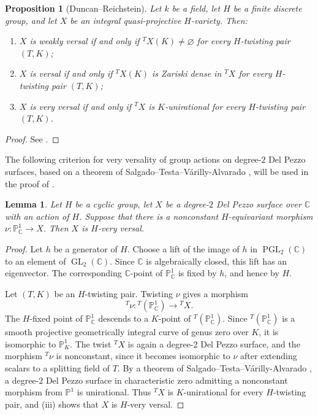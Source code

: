 \documentclass{amsart}
\newtheorem{prop}[prop]{Proposition}
\newtheorem{lemma}[lemma]{Lemma}
\theoremstyle{definition}
\theoremstyle{remark}
\numberwithin{equation}{section}
\newcommand{\C}{\mathbb C}
\renewcommand{\P}{\mathbb P}
\begin{document}
\begin{prop}[Duncan--Reichstein]\label{prop:twist-criterion}
Let $k$ be a field, let $H$ be a finite discrete group, and let $X$ be an integral quasi-projective $H$-variety. Then:
\begin{enumerate}[label=\textup{(\roman*)}]
 \item $X$ is weakly versal if and only if
 ${}^T\!X(K)\ne\varnothing$ for every $H$-twisting pair $(T,K)$;
 \item $X$ is versal if and only if ${}^T\!X(K)$ is Zariski dense in
 ${}^T\!X$ for every $H$-twisting pair $(T,K)$;
 \item $X$ is very versal if and only if ${}^T\!X$ is $K$-unirational
 for every $H$-twisting pair $(T,K)$.
\end{enumerate}
\end{prop}

\begin{proof}
See \cite[Theorem~1.1(a)--(c)]{Duncan-Reichstein}.
\end{proof}

The following criterion for very versality of group actions on degree-$2$
Del Pezzo surfaces, based on a theorem of Salgado--Testa--V\'arilly-Alvarado \cite[Theorem~17]{Salgado-Testa-VA}, will be used in the proof of .

\begin{lemma}\label{lem:fixed-rational-curve}
Let $H$ be a cyclic group, let $X$ be a degree-$2$ Del Pezzo surface over $\C$ with an action of $H$. Suppose that there is a nonconstant $H$-equivariant morphism $\nu:\mathbb P^1_\C\to X$. Then $X$ is $H$-very versal.
\end{lemma}

\begin{proof}
Let $h$ be a generator of $H$. Choose a lift of the image of $h$ in
$\operatorname{PGL}_2(\C)$ to an element of $\operatorname{GL}_2(\C)$. Since
$\C$ is algebraically closed, this lift has an eigenvector. The corresponding
$\C$-point of $\mathbb P^1_\C$ is fixed by $h$, and hence by $H$.

Let $(T,K)$ be an $H$-twisting pair. Twisting $\nu$ gives a morphism
\[
 {}^T\!\nu:{}^T\!(\mathbb P^1_\C)\longrightarrow{}^T\!X.
\]
The $H$-fixed point of $\mathbb P^1_\C$ descends to a $K$-point of
${}^T\!(\mathbb P^1_\C)$. Since ${}^T\!(\mathbb P^1_\C)$ is a smooth projective
geometrically integral curve of genus zero over $K$, it is isomorphic to $\P^1_K$. The twist ${}^T\!X$ is again a degree-$2$ Del Pezzo surface, and the morphism ${}^T\!\nu$ is nonconstant, since it becomes isomorphic to $\nu$ after extending scalars to a splitting field of $T$. By a theorem of Salgado--Testa--V\'arilly-Alvarado
\cite[Theorem~17]{Salgado-Testa-VA}, a degree-$2$ Del Pezzo surface in
characteristic zero admitting a nonconstant morphism from $\mathbb P^1$ is
unirational. Thus ${}^T\!X$ is $K$-unirational for every $H$-twisting pair,
and (iii) shows that $X$ is $H$-very versal.
\end{proof}
\end{document}
